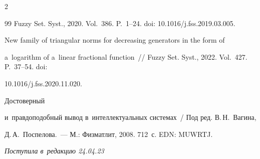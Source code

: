\begin{multicols}{2}
{{\begin{thebibliography}{99}
Fuzzy Set. Syst., 2020. Vol.~386. P.~1--24. doi: 10.1016/j.fss.2019.03.005.







 New family of triangular norms for decreasing generators in the form of 


a~logarithm of a~linear fractional function~// Fuzzy Set. Syst., 2022. Vol.~427. P.~37--54. doi: 


10.1016/j.fss.2020.11.020.







 Достоверный 


и~правдоподобный вывод в~интеллектуальных системах~/ Под ред. В.\,Н.~Вагина, 


Д.\,А.~Поспелова.~--- М.: Физматлит, 2008. 712~с. EDN: MUWRTJ.


\end{thebibliography}





 }


 }





\end{multicols}





\vspace*{-6pt}





\hfill{\small\textit{Поступила в~редакцию 24.04.23}}





\vspace*{8pt}




















